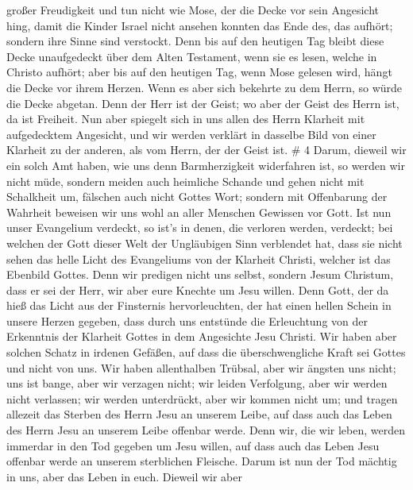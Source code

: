 großer Freudigkeit  und tun nicht wie Mose, der die Decke
vor sein Angesicht hing, damit die Kinder Israel nicht ansehen konnten
das Ende des, das aufhört;  sondern ihre Sinne sind
verstockt. Denn bis auf den heutigen Tag bleibt diese Decke unaufgedeckt
über dem Alten Testament, wenn sie es lesen, welche in Christo aufhört;
 aber bis auf den heutigen Tag, wenn Mose gelesen wird,
hängt die Decke vor ihrem Herzen.  Wenn es aber sich
bekehrte zu dem Herrn, so würde die Decke abgetan.  Denn
der Herr ist der Geist; wo aber der Geist des Herrn ist, da ist
Freiheit.  Nun aber spiegelt sich in uns allen des Herrn
Klarheit mit aufgedecktem Angesicht, und wir werden verklärt in dasselbe
Bild von einer Klarheit zu der anderen, als vom Herrn, der der Geist
ist. \# 4  Darum, dieweil wir ein solch Amt haben, wie uns
denn Barmherzigkeit widerfahren ist, so werden wir nicht müde,
 sondern meiden auch heimliche Schande und gehen nicht mit
Schalkheit um, fälschen auch nicht Gottes Wort; sondern mit Offenbarung
der Wahrheit beweisen wir uns wohl an aller Menschen Gewissen vor Gott.
 Ist nun unser Evangelium verdeckt, so ist's in denen, die
verloren werden, verdeckt;  bei welchen der Gott dieser Welt
der Ungläubigen Sinn verblendet hat, dass sie nicht sehen das helle
Licht des Evangeliums von der Klarheit Christi, welcher ist das Ebenbild
Gottes.  Denn wir predigen nicht uns selbst, sondern Jesum
Christum, dass er sei der Herr, wir aber eure Knechte um Jesu willen.
 Denn Gott, der da hieß das Licht aus der Finsternis
hervorleuchten, der hat einen hellen Schein in unsere Herzen gegeben,
dass durch uns entstünde die Erleuchtung von der Erkenntnis der Klarheit
Gottes in dem Angesichte Jesu Christi.  Wir haben aber
solchen Schatz in irdenen Gefäßen, auf dass die überschwengliche Kraft
sei Gottes und nicht von uns.  Wir haben allenthalben
Trübsal, aber wir ängsten uns nicht; uns ist bange, aber wir verzagen
nicht;  wir leiden Verfolgung, aber wir werden nicht
verlassen; wir werden unterdrückt, aber wir kommen nicht um;
 und tragen allezeit das Sterben des Herrn Jesu an unserem
Leibe, auf dass auch das Leben des Herrn Jesu an unserem Leibe offenbar
werde.  Denn wir, die wir leben, werden immerdar in den Tod
gegeben um Jesu willen, auf dass auch das Leben Jesu offenbar werde an
unserem sterblichen Fleische.  Darum ist nun der Tod
mächtig in uns, aber das Leben in euch.  Dieweil wir aber
